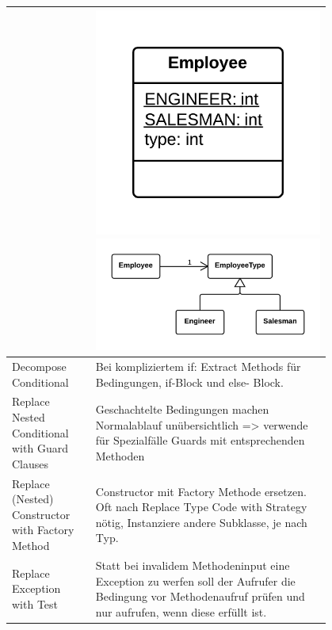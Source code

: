 \documentclass[a4paper, fontsize=6pt]{scrartcl}
\begin{document}
\begin{multicols*}{5}
\begin{tabular}{|p{0.2\linewidth}|p{0.6\linewidth}|}
 & \includegraphics[scale=0.07]{ReplaceTypeCodeWithStateStrategyBefore.png}
 \includegraphics[scale=0.05]{ReplaceTypeCodeWithStateStrategyAfter.png}\\ 
 \hline
 Decompose Conditional & Bei kompliziertem if: Extract Methods für Bedingungen, if-Block und else- Block. \\ 
 \hline
 Replace Nested Conditional with Guard Clauses & Geschachtelte Bedingungen machen Normalablauf unübersichtlich => verwende für Spezialfälle Guards mit entsprechenden Methoden \\ 
 \hline
 Replace (Nested) Constructor with Factory Method & Constructor mit Factory Methode ersetzen. Oft nach Replace Type Code with Strategy nötig, Instanziere andere Subklasse, je nach Typ. \\ 
 \hline
 Replace Exception with Test & Statt bei invalidem Methodeninput eine Exception zu werfen soll der Aufrufer die Bedingung vor Methodenaufruf prüfen und nur aufrufen, wenn diese erfüllt ist. \\ 
 \hline
 \end{tabular}
 

\end{multicols*}
\end{document}
